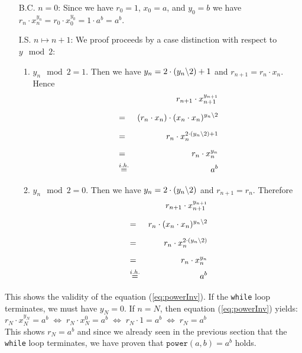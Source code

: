 \begin{enumerate}
\item[B.C.] $n=0$: Since we have $r_0 = 1$, $x_0 = a$, and $y_0 = b$ we have 
            \\[0.2cm]
            \hspace*{1.3cm}
            $r_n \cdot x_n^{y_n} = r_0 \cdot x_0^{y_0} = 1 \cdot a^{b} = a^b$.
\item[I.S.] $n \mapsto n + 1$:  We proof proceeds by a case distinction with respect to $y \mod 2$:
            \begin{enumerate}
            \item $y_n \mod 2 = 1$.  Then we have $y_{n} = 2 \cdot (y_n\symbol{92}2) + 1$ and
                  $r_{n+1} = r_n \cdot x_n$.  Hence
                  \begin{eqnarray*}
                      &   & r_{n+1} \cdot x_{n+1}^{y_{n+1}} \\[0.2cm] 
                      & = & (r_{n} \cdot x_n) \cdot (x_{n} \cdot x_{n})^{y_{n}\symbol{92}2} \\[0.2cm] 
                      & = & r_{n} \cdot x_n^{2 \cdot (y_{n}\symbol{92}2) + 1} \\[0.2cm] 
                      & = & r_{n} \cdot x_n^{y_n} \\
                      & \stackrel{i.h.}{=} & a^{b} 
                  \end{eqnarray*}
\pagebreak

            \item $y_n \mod 2 = 0$.  Then we have $y_{n} = 2 \cdot (y_n\symbol{92}2)$ and $r_{n+1} = r_n$.
                  Therefore
                  \begin{eqnarray*}
                      &   & r_{n+1} \cdot x_{n+1}^{y_{n+1}} \\[0.2cm] 
                      & = & r_{n} \cdot (x_{n} \cdot x_{n})^{y_{n}\symbol{92}2} \\[0.2cm] 
                      & = & r_{n} \cdot x_n^{2 \cdot (y_{n} \symbol{92} 2)} \\[0.2cm] 
                      & = & r_{n} \cdot x_n^{y_n} \\
                      & \stackrel{i.h.}{=} & a^{b} 
                  \end{eqnarray*}
            \end{enumerate}
\end{enumerate}
This shows the validity of the equation (\ref{eq:powerInv}).   If the \texttt{while} loop
terminates, we must have $y_N = 0$.  If $n=N$, then equation (\ref{eq:powerInv}) yields:
\\[0.2cm]
\hspace*{1.3cm}
$r_N \cdot x_N^{y_N} = a^b
 \;\Longleftrightarrow\; r_N \cdot x_N^{0}   = a^b
 \;\Longleftrightarrow\;  r_N \cdot 1         = a^b
 \;\Longleftrightarrow\;  r_N                 = a^b
$
\\[0.2cm]
This shows $r_N = a^b$ and since we already seen in the previous section that the
\texttt{while} loop terminates, we have proven that
$\texttt{power}(a,b) =a^b$ holds.


